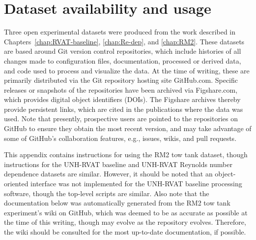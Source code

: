 \chapter{Dataset availability and usage}
\doublespace

Three open experimental datasets were produced from the work described in
Chapters~\ref{chap:RVAT-baseline}, \ref{chap:Re-dep}, and \ref{chap:RM2}. These
datasets are based around Git version control repositories, which include
histories of all changes made to configuration files, documentation, processed
or derived data, and code used to process and visualize the data. At the time of
writing, these are primarily distributed via the Git repository hosting site
GitHub.com. Specific releases or snapshots of the repositories have been
archived via Figshare.com, which provides digital object identifiers (DOIs). The
Figshare archives thereby provide persistent links, which are cited in the
publications where the data was used. Note that presently, prospective users are
pointed to the repositories on GitHub to ensure they obtain the most recent
version, and may take advantage of some of GitHub's collaboration features,
e.g., issues, wikis, and pull requests.

This appendix contains instructions for using the RM2 tow tank dataset, though
instructions for the UNH-RVAT baseline and UNH-RVAT Reynolds number dependence
datasets are similar. However, it should be noted that an object-oriented
interface was not implemented for the UNH-RVAT baseline processing software,
though the top-level scripts are similar. Also note that the documentation below
was automatically generated from the RM2 tow tank experiment's wiki on GitHub,
which was deemed to be as accurate as possible at the time of this writing,
though may evolve as the repository evolves. Therefore, the wiki should be
consulted for the most up-to-date documentation, if possible.



